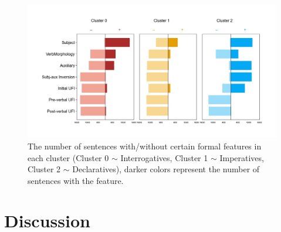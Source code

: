 \begin{figure}[H]
    \centering
    \includegraphics[width=1\textwidth]{figures/noisy100-syncluster.jpg}
    \caption{The number of sentences with/without certain formal features in each cluster (Cluster 0 $\sim$ Interrogatives, Cluster 1 $\sim$ Imperatives, Cluster 2 $\sim$ Declaratives), darker colors represent the number of sentences with the feature.}
    \label{fig:noisy100-syncluster}
\end{figure}


\section{Discussion}
\label{sec:mancl:discussion}




